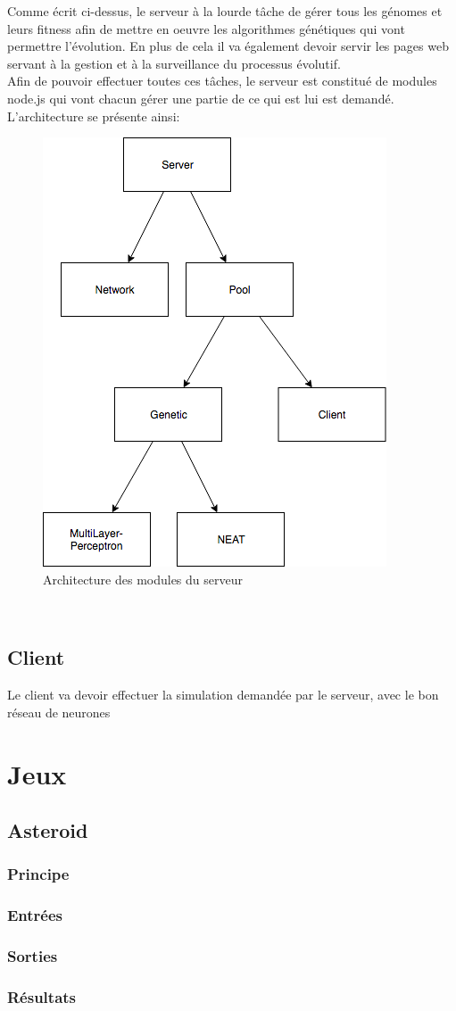 \documentclass{article}
\begin{document}
Comme écrit ci-dessus, le serveur à la lourde tâche de gérer tous les génomes et leurs fitness afin de mettre en oeuvre les algorithmes génétiques qui vont permettre l'évolution. En plus de cela il va également devoir servir les pages web servant à la gestion et à la surveillance du processus évolutif.\\
Afin de pouvoir effectuer toutes ces tâches, le serveur est constitué de modules node.js qui vont chacun gérer une partie de ce qui est lui est demandé.\\
L'architecture se présente ainsi:
\begin{figure}[h]
\begin{center}
	\includegraphics[scale=0.5]{"server.png"} 
	\caption{Architecture des modules du serveur}
\end{center}
\end{figure}\\

\subsection{Client}

Le client va devoir effectuer la simulation demandée par le serveur, avec le bon réseau de neurones


\section{Jeux}
\subsection{Asteroid}
\subsubsection{Principe}
\subsubsection{Entrées}
\subsubsection{Sorties}
\subsubsection{Résultats}



\end{document}

